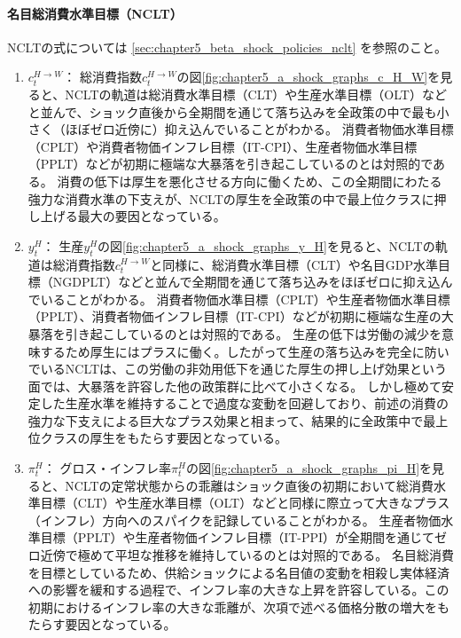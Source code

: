 \paragraph{名目総消費水準目標（NCLT）}
\label{sec:chapter5_a_shock_policies_nclt}
NCLTの式については
\ref{sec:chapter5_beta_shock_policies_nclt}
を参照のこと。
\begin{enumerate}
    \item
    \label{itm:chapter5_a_shock_policies_nclt_c_H_W}
        \(c_t^{H\to W}\)：
        総消費指数\(c_t^{H\to W}\)の図\ref{fig:chapter5_a_shock_graphs_c_H_W}を見ると、NCLTの軌道は総消費水準目標（CLT）や生産水準目標（OLT）などと並んで、ショック直後から全期間を通じて落ち込みを全政策の中で最も小さく（ほぼゼロ近傍に）抑え込んでいることがわかる。
        消費者物価水準目標（CPLT）や消費者物価インフレ目標（IT-CPI）、生産者物価水準目標（PPLT）などが初期に極端な大暴落を引き起こしているのとは対照的である。
        消費の低下は厚生を悪化させる方向に働くため、この全期間にわたる強力な消費水準の下支えが、NCLTの厚生を全政策の中で最上位クラスに押し上げる最大の要因となっている。
    \item
    \label{itm:chapter5_a_shock_policies_nclt_y_H}
        \(y_t^H\)：
        生産\(y_t^H\)の図\ref{fig:chapter5_a_shock_graphs_y_H}を見ると、NCLTの軌道は総消費指数\(c_t^{H\to W}\)と同様に、総消費水準目標（CLT）や名目GDP水準目標（NGDPLT）などと並んで全期間を通じて落ち込みをほぼゼロに抑え込んでいることがわかる。
        消費者物価水準目標（CPLT）や生産者物価水準目標（PPLT）、消費者物価インフレ目標（IT-CPI）などが初期に極端な生産の大暴落を引き起こしているのとは対照的である。
        生産の低下は労働の減少を意味するため厚生にはプラスに働く。したがって生産の落ち込みを完全に防いでいるNCLTは、この労働の非効用低下を通じた厚生の押し上げ効果という面では、大暴落を許容した他の政策群に比べて小さくなる。
        しかし極めて安定した生産水準を維持することで過度な変動を回避しており、前述の消費の強力な下支えによる巨大なプラス効果と相まって、結果的に全政策中で最上位クラスの厚生をもたらす要因となっている。
    \item
    \label{itm:chapter5_a_shock_policies_nclt_pi_H}
        \(\pi_t^H\)：
        グロス・インフレ率\(\pi_t^H\)の図\ref{fig:chapter5_a_shock_graphs_pi_H}を見ると、NCLTの定常状態からの乖離はショック直後の初期において総消費水準目標（CLT）や生産水準目標（OLT）などと同様に際立って大きなプラス（インフレ）方向へのスパイクを記録していることがわかる。
        生産者物価水準目標（PPLT）や生産者物価インフレ目標（IT-PPI）が全期間を通じてゼロ近傍で極めて平坦な推移を維持しているのとは対照的である。
        名目総消費を目標としているため、供給ショックによる名目値の変動を相殺し実体経済への影響を緩和する過程で、インフレ率の大きな上昇を許容している。この初期におけるインフレ率の大きな乖離が、次項で述べる価格分散の増大をもたらす要因となっている。

\end{enumerate}
